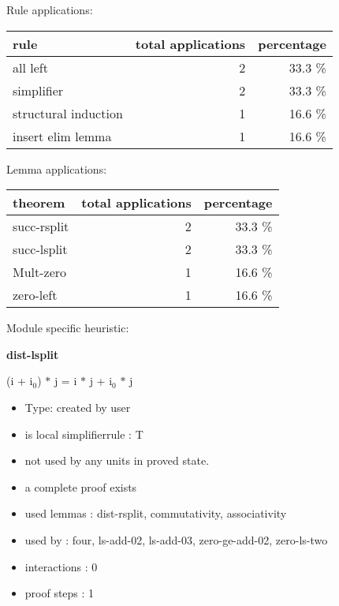 \documentclass[a4paper]{article}
\begin{document}
Rule applications:

\begin{supertabular}{l|r|r}
rule	        & total applications & percentage \\ \hline
all left & 2 & 33.3 \% \\
simplifier & 2 & 33.3 \% \\
structural induction & 1 & 16.6 \% \\
insert elim lemma & 1 & 16.6 \% \\

\end{supertabular}

Lemma applications:

\begin{supertabular}{l|r|r}
theorem	        & total applications & percentage \\ \hline
succ-rsplit & 2 & 33.3 \% \\
succ-lsplit & 2 & 33.3 \% \\
Mult-zero & 1 & 16.6 \% \\
zero-left & 1 & 16.6 \% \\

\end{supertabular}

Module specific heuristic:

\pagebreak

{\LARGE\bf dist-lsplit}\label{lemma-dist-lsplit}

\medskip

 \Fol (i + $\mbox{i}_{0}$) $*$ j = i $*$ j + $\mbox{i}_{0}$ $*$ j

\begin{itemize}

\item Type: created by user

\item is local simplifierrule : T
\item not used by any units in proved state.
\item       a complete proof exists
\item       used lemmas  : dist-rsplit, commutativity, associativity
\item       used by      : four, ls-add-02, ls-add-03, zero-ge-add-02, zero-ls-two
\item       interactions : 0
\item       proof steps  : 1
\end{itemize}

\medskip
\end{document}
